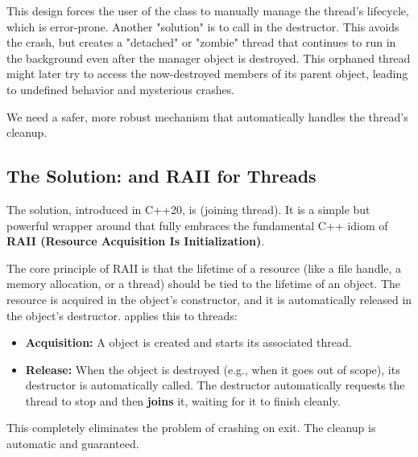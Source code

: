 This design forces the user of the class to manually manage the thread's lifecycle, which is error-prone. Another "solution" is to call  in the destructor. This avoids the crash, but creates a "detached" or "zombie" thread that continues to run in the background even after the manager object is destroyed. This orphaned thread might later try to access the now-destroyed members of its parent object, leading to undefined behavior and mysterious crashes.

We need a safer, more robust mechanism that automatically handles the thread's cleanup.

\subsection{The Solution:  and RAII for Threads}
\label{subsec:solution-jthread}

The solution, introduced in C++20, is \textbf{} (joining thread). It is a simple but powerful wrapper around  that fully embraces the fundamental C++ idiom of \textbf{RAII (Resource Acquisition Is Initialization)}.

The core principle of RAII is that the lifetime of a resource (like a file handle, a memory allocation, or a thread) should be tied to the lifetime of an object. The resource is acquired in the object's constructor, and it is automatically released in the object's destructor.  applies this to threads:
\begin{itemize}
    \item \textbf{Acquisition:} A  object is created and starts its associated thread.
    \item \textbf{Release:} When the  object is destroyed (e.g., when it goes out of scope), its destructor is automatically called. The destructor automatically requests the thread to stop and then \textbf{joins} it, waiting for it to finish cleanly.
\end{itemize}

This completely eliminates the problem of crashing on exit. The cleanup is automatic and guaranteed.

